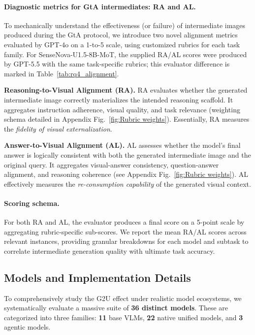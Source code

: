 \documentclass{article}
\theoremstyle{plain}
\theoremstyle{definition}
\theoremstyle{remark}
\begin{document}
\paragraph{Diagnostic metrics for GtA intermediates: RA and AL.}
To mechanically understand the effectiveness (or failure) of intermediate images produced during the GtA protocol, we introduce two novel alignment metrics evaluated by GPT-4o on a 1-to-5 scale, using customized rubrics for each task family. For SenseNova-U1.5-8B-MoT, the supplied RA/AL scores were produced by GPT-5.5 with the same task-specific rubrics; this evaluator difference is marked in Table~\ref{tab:rq4_alignment}.

\textbf{Reasoning-to-Visual Alignment (RA).}
RA evaluates whether the generated intermediate image correctly materializes the intended reasoning scaffold. It aggregates instruction adherence, visual quality, and task relevance (weighting schema detailed in Appendix Fig.~\ref{fig:Rubric weights}). Essentially, RA measures the \emph{fidelity of visual externalization}.

\textbf{Answer-to-Visual Alignment (AL).}
AL assesses whether the model's final answer is logically consistent with both the generated intermediate image and the original query. It aggregates visual-answer consistency, question-answer alignment, and reasoning coherence (see Appendix Fig.~\ref{fig:Rubric weights}). AL effectively measures the \emph{re-consumption capability} of the generated visual context.

\paragraph{Scoring schema.}
For both RA and AL, the evaluator produces a final score on a 5-point scale by aggregating rubric-specific sub-scores. We report the mean RA/AL scores across relevant instances, providing granular breakdowns for each model and subtask to correlate intermediate generation quality with ultimate task accuracy.

\subsection{Models and Implementation Details}
\label{sec:models-impl}

To comprehensively study the G2U effect under realistic model ecosystems, we systematically evaluate a massive suite of \textbf{36 distinct models}. These are categorized into three families: \textbf{11} base VLMs, \textbf{22} native unified models, and \textbf{3} agentic models.
\end{document}
